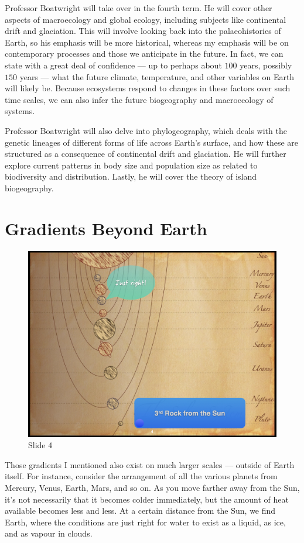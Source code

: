\documentclass[
  10pt,
]{book}
\begin{document}
Professor Boatwright will take over in the fourth term. He will cover
other aspects of macroecology and global ecology, including subjects
like continental drift and glaciation. This will involve looking back
into the palaeohistories of Earth, so his emphasis will be more
historical, whereas my emphasis will be on contemporary processes and
those we anticipate in the future. In fact, we can state with a great
deal of confidence --- up to perhaps about \(100\) years, possibly
\(150\) years --- what the future climate, temperature, and other
variables on Earth will likely be. Because ecosystems respond to changes
in these factors over such time scales, we can also infer the future
biogeography and macroecology of systems.

Professor Boatwright will also delve into phylogeography, which deals
with the genetic lineages of different forms of life across Earth's
surface, and how these are structured as a consequence of continental
drift and glaciation. He will further explore current patterns in body
size and population size as related to biodiversity and distribution.
Lastly, he will cover the theory of island biogeography.

\section{Gradients Beyond Earth}\label{gradients-beyond-earth}

\begin{figure}[ht]
\centering
\includegraphics[width=0.8\linewidth]{../images/BDC334/BDC334-004.jpeg}
\caption*{Slide 4}
\end{figure}

Those gradients I mentioned also exist on much larger scales --- outside
of Earth itself. For instance, consider the arrangement of all the
various planets from Mercury, Venus, Earth, Mars, and so on. As you move
farther away from the Sun, it's not necessarily that it becomes colder
immediately, but the amount of heat available becomes less and less. At
a certain distance from the Sun, we find Earth, where the conditions are
just right for water to exist as a liquid, as ice, and as vapour in
clouds.
\end{document}
